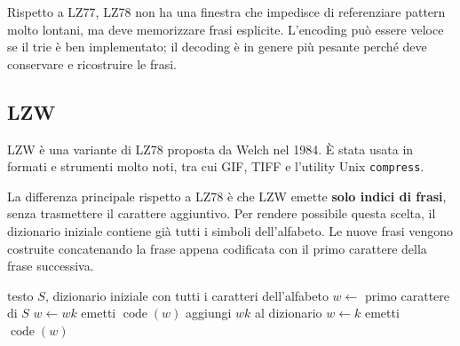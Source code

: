 \documentclass{article}
\theoremstyle{definition}
\numberwithin{equation}{section}
\begin{document}
Rispetto a LZ77, LZ78 non ha una finestra che impedisce di referenziare pattern molto lontani, ma deve memorizzare frasi esplicite. L'encoding può essere veloce se il trie è ben implementato; il decoding è in genere più pesante perché deve conservare e ricostruire le frasi.

\subsection{LZW}
LZW è una variante di LZ78 proposta da Welch nel 1984. È stata usata in formati e strumenti molto noti, tra cui GIF, TIFF e l'utility Unix \texttt{compress}.

La differenza principale rispetto a LZ78 è che LZW emette \textbf{solo indici di frasi}, senza trasmettere il carattere aggiuntivo. Per rendere possibile questa scelta, il dizionario iniziale contiene già tutti i simboli dell'alfabeto. Le nuove frasi vengono costruite concatenando la frase appena codificata con il primo carattere della frase successiva.

\begin{algorithm}[htpb]
    \caption{Schema di codifica LZW}
    \begin{algorithmic}[1]
        \Require testo $S$, dizionario iniziale con tutti i caratteri dell'alfabeto
        \State $w\gets$ primo carattere di $S$
        \State $w\gets wk$
        \Else
        \State emetti $\operatorname{code}(w)$
        \State aggiungi $wk$ al dizionario
        \State $w\gets k$
        \EndIf
        \EndFor
        \State emetti $\operatorname{code}(w)$
    \end{algorithmic}
    \label{alg:lzw_encoding}
\end{algorithm}
\end{document}
